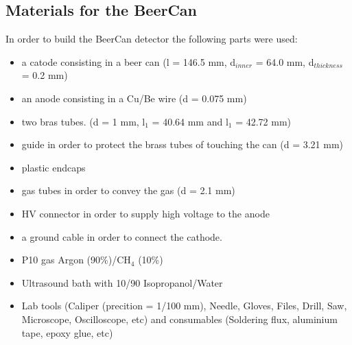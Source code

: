 \subsection{Materials for the BeerCan}
\label{sec:materials_beercan}
In order to build the BeerCan detector the following parts were used:
\begin{itemize}
\item a catode consisting in a beer can (l = 146.5 mm, d$_{inner}$ = 64.0 mm,
  d$_{thickness}$ = 0.2 mm)
\item an anode consisting in a Cu/Be wire (d = 0.075 mm)
\item two bras tubes. (d = 1 mm, l$_{1}$ = 40.64 mm and l$_{1}$ = 42.72 mm)
\item guide in order to protect the brass tubes of touching the can (d = 3.21
  mm)
\item plastic endcaps
\item gas tubes in order to convey the gas (d = 2.1 mm)
\item HV connector in order to supply high voltage to the anode
\item a ground cable in order to connect the cathode.
\item P10 gas Argon (90\%)/CH$_{4}$ (10\%)
\item Ultrasound bath with 10/90 Isopropanol/Water
\item Lab tools (Caliper (precition = 1/100 mm), Needle, Gloves, Files, Drill,
  Saw, Microscope, Oscilloscope, etc) and consumables (Soldering flux, aluminium
  tape, epoxy glue, etc)
\end{itemize}

